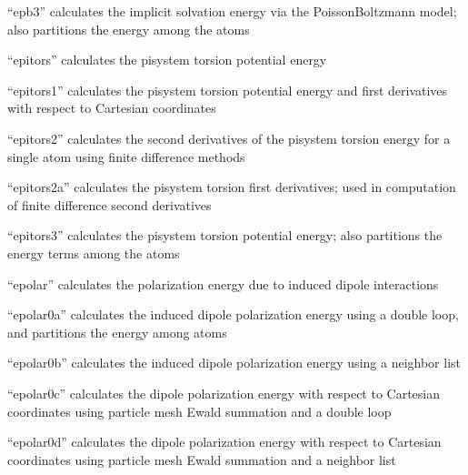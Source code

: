 \documentclass[letterpaper,11pt,english]{sphinxmanual}
\begin{document}
“epb3” calculates the implicit solvation energy via the
Poisson\sphinxhyphen{}Boltzmann model; also partitions the energy among
the atoms


“epitors” calculates the pi\sphinxhyphen{}system torsion potential energy


“epitors1” calculates the pi\sphinxhyphen{}system torsion potential energy
and first derivatives with respect to Cartesian coordinates


“epitors2” calculates the second derivatives of the pi\sphinxhyphen{}system
torsion energy for a single atom using finite difference methods


“epitors2a” calculates the pi\sphinxhyphen{}system torsion first derivatives;
used in computation of finite difference second derivatives


“epitors3” calculates the pi\sphinxhyphen{}system torsion potential energy;
also partitions the energy terms among the atoms


“epolar” calculates the polarization energy due to induced
dipole interactions


“epolar0a” calculates the induced dipole polarization energy
using a double loop, and partitions the energy among atoms


“epolar0b” calculates the induced dipole polarization energy
using a neighbor list


“epolar0c” calculates the dipole polarization energy with respect
to Cartesian coordinates using particle mesh Ewald summation and
a double loop


“epolar0d” calculates the dipole polarization energy with respect
to Cartesian coordinates using particle mesh Ewald summation and
a neighbor list

\end{document}
